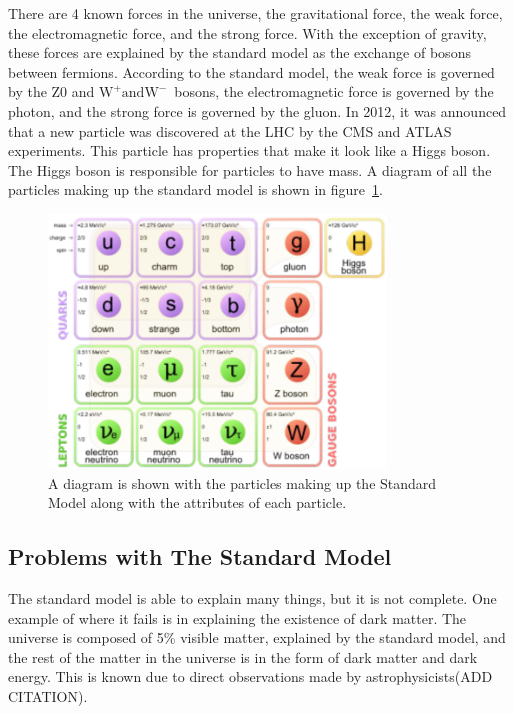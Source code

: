 There are 4 known forces in the universe, the gravitational force, the weak force, the electromagnetic force, and the strong force.
With the exception of gravity, these forces are explained by the standard model as the exchange of bosons between fermions.
According to the standard model, the weak force is governed by the Z0 and $\mathrm{W^{+} and W^{-}}$~bosons,
the electromagnetic force is governed by the photon, and the strong force is governed by the gluon.
In 2012, it was announced that a new particle was discovered at the LHC by the CMS and ATLAS experiments.
This particle has properties that make it look like a Higgs boson.
The Higgs boson is responsible for particles to have mass.
A diagram of all the particles making up the standard model is shown in figure~\ref{fig:SM}.

\begin{figure}[!htb]
  \begin{center}
    \includegraphics[width=0.8\textwidth]{intro/figs/Standard_Model_of_Elementary_Particles.pdf}
    \caption{
      \label{fig:SM}
      A diagram is shown with the particles making up the Standard Model along with the attributes of each particle.
    }
  \end{center}
\end{figure}

\subsection{Problems with The Standard Model}
The standard model is able to explain many things, but it is not complete.
One example of where it fails is in explaining the existence of dark matter.
The universe is composed of 5\% visible matter, explained by the standard model,
and the rest of the matter in the universe is in the form of dark matter and dark energy.
This is known due to direct observations made by astrophysicists(ADD CITATION).


